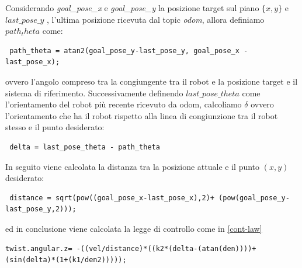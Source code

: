 \documentclass[a4paper,11 pt,oneside]{book}
\theoremstyle{definition}
\begin{document}
Considerando \emph{goal_pose_x} e \emph{goal_pose_y} la posizione target sul piano $\{x,y\}$ e $last\_pose\_y$ , l'ultima posizione ricevuta dal topic \emph{odom}, allora definiamo $path_theta$ come:
\begin{lstlisting}
 path_theta = atan2(goal_pose_y-last_pose_y, goal_pose_x -last_pose_x);
\end{lstlisting}
ovvero l'angolo compreso tra la congiungente tra il robot e la posizione target e il sistema di riferimento.
Successivamente definendo $last\_pose\_theta$ come l'orientamento del robot più recente ricevuto da odom, calcoliamo $\delta$ ovvero l'orientamento che ha il robot rispetto alla linea di congiunzione tra il robot stesso e il punto desiderato:
 \begin{lstlisting}
 delta = last_pose_theta - path_theta
  \end{lstlisting} 
In seguito viene calcolata la distanza tra la posizione attuale e il punto $(x, y)$ desiderato: 
 \begin{lstlisting}
 distance = sqrt(pow((goal_pose_x-last_pose_x),2)+ (pow(goal_pose_y-last_pose_y,2))); 
\end{lstlisting} 
ed in conclusione viene calcolata la legge di controllo come in \eqref{cont-law}
\begin{lstlisting}
twist.angular.z= -((vel/distance)*((k2*(delta-(atan(den))))+(sin(delta)*(1+(k1/den2)))));
\end{lstlisting}
\end{document}
